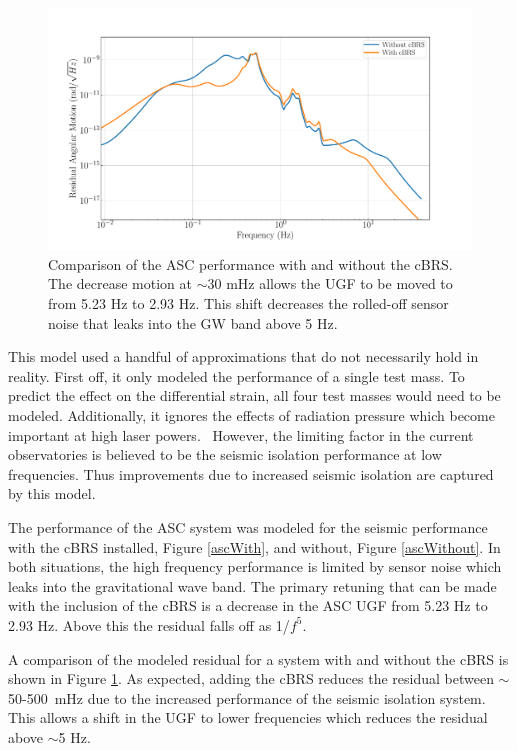 \documentclass [12pt, proquest]{uwthesis}[2019]
\begin{document}
\begin{figure}[!h]
\begin{center}
\includegraphics[width=\textwidth]{cBRS_ASC_LowF.pdf}
\caption[Comparison of the ASC performance with and without the cBRS]{Comparison of the ASC performance with and without the cBRS. The decrease motion at $\sim$30 mHz allows the UGF to be moved to from 5.23 Hz to 2.93 Hz. This shift decreases the rolled-off sensor noise that leaks into the GW band above 5 Hz.}
\label{ascComp}
\end{center}
\end{figure}

This model used a handful of approximations that do not necessarily hold in reality. First off, it only modeled the performance of a single test mass. To predict the effect on the differential strain, all four test masses would need to be modeled. Additionally, it ignores the effects of radiation pressure which become important at high laser powers.~\cite{ASC} However, the limiting factor in the current observatories is believed to be the seismic isolation performance at low frequencies. Thus improvements due to increased seismic isolation are captured by this model.

The performance of the ASC system was modeled for the seismic performance with the cBRS installed, Figure \ref{ascWith}, and without, Figure \ref{ascWithout}. In both situations, the high frequency performance is limited by sensor noise which leaks into the gravitational wave band. The primary retuning that can be made with the inclusion of the cBRS is a decrease in the ASC UGF from 5.23 Hz to 2.93 Hz. Above this the residual falls off as 1/$f^5$.


A comparison of the modeled residual for a system with and without the cBRS is shown in Figure \ref{ascComp}. As expected, adding the cBRS reduces the residual between $\sim$50-500~mHz due to the increased performance of the seismic isolation system. This allows a shift in the UGF to lower frequencies which reduces the residual above $\sim$5 Hz. 
\end{document}
